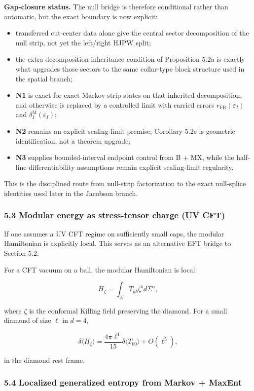 \textbf{Gap-closure status.} The null bridge is therefore conditional rather than automatic, but the exact boundary is now explicit:
\begin{itemize}
\tightlist
\item
  transferred cut-center data alone give the central sector decomposition of the null strip, not yet the left/right HJPW split;
\item
  the extra decomposition-inheritance condition of Proposition 5.2a is exactly what upgrades those sectors to the same collar-type block structure used in the spatial branch;
\item
  \textbf{N1} is exact for exact Markov strip states on that inherited decomposition, and otherwise is replaced by a controlled limit with carried errors \(r_{\mathrm{FR}}(\varepsilon_I)\) and \(\delta^{\mathrm M}_{I}(\varepsilon_I)\);
\item
  \textbf{N2} remains an explicit scaling-limit premise; Corollary 5.2e is geometric identification, not a theorem upgrade;
\item
  \textbf{N3} supplies bounded-interval endpoint control from B + MX, while the half-line differentiability assumptions remain explicit scaling-limit regularity.
\end{itemize}
This is the disciplined route from null-strip factorization to the exact null-splice identities used later in the Jacobson branch.
\subsubsection{5.3 Modular energy as stress-tensor charge (UV CFT)}\label{53-modular-energy-as-stress-tensor-charge-uv-cft}

If one assumes a UV CFT regime on sufficiently small caps, the modular Hamiltonian is explicitly local. This serves as an alternative EFT bridge to Section 5.2.

For a CFT vacuum on a ball, the modular Hamiltonian is local:

\[
H_{\zeta} = \int_{\Sigma} T_{ab} \zeta^b d\Sigma^a,
\]

where \(\zeta\) is the conformal Killing field preserving the diamond. For a small diamond of size \(\ell\) in \(d=4\),

\[
\delta \langle H_{\zeta} \rangle = \frac{4 \pi \ell^4}{15} \delta \langle T_{00} \rangle + O(\ell^5),
\]

in the diamond rest frame.

\subsubsection{5.4 Localized generalized entropy from Markov + MaxEnt}\label{54-localized-generalized-entropy-from-markov--maxent}

